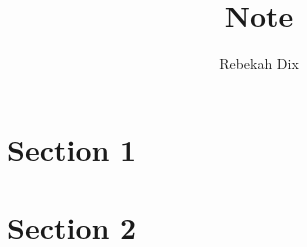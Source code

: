 \documentclass[11pt]{article}
\title{Note}
\author{Rebekah Dix}
\begin{document}
\maketitle

\tableofcontents
\listoftodos

\section{Section 1}


\section{Section 2}

\citet{McAfee1992-sn}

\newpage
\printbibliography
\end{document}
